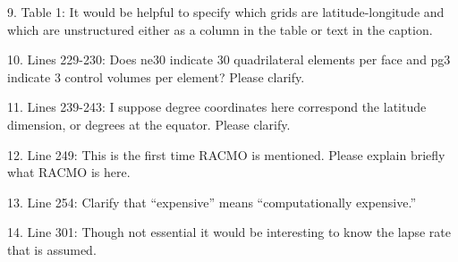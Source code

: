 \documentclass[12pt,oneside,a4paper]{article}%
\begin{document}
{\color{blue}{Done.}} \newline

9. Table 1: It would be helpful to specify which grids are latitude-longitude and which are unstructured either as a column in the table or text in the caption.  \newline

{\color{blue}{Added to the text which grids are lat-lon and which are unstructured.}} \newline

10. Lines 229-230: Does ne30 indicate 30 quadrilateral elements per face and pg3 indicate 3 control volumes per element? Please clarify. \newline

{\color{blue}{The text indicates that ne30 indicates are 30x30 elements per cube-face, and pg3 refers to 3x3 control volumes per element. The global number of grid columns is then 6 faces * 30x30 elements per face * 3x3 control volumes per element.}} \newline

11. Lines 239-243: I suppose degree coordinates here correspond the latitude dimension, or degrees at the equator. Please clarify.  \newline

{\color{blue}{Done.}} \newline

12. Line 249: This is the first time RACMO is mentioned. Please explain briefly what RACMO is here.  \newline

{\color{blue}{Fixed.}} \newline

13. Line 254: Clarify that “expensive” means “computationally expensive.” \newline

{\color{blue}{This information has been absorbed into a new sub-section on computational costs. References to ``cheaper" or ``more expensive" are more obviously referring computational costs as that is the title of the section.}} \newline

14. Line 301: Though not essential it would be interesting to know the lapse rate that is assumed. \newline

{\color{blue}{6.5K/km. I'd refer to reviewer to the Sellevold et al paper referenced, for more details on the choice of lapse rate.}} \newline
\end{document}
